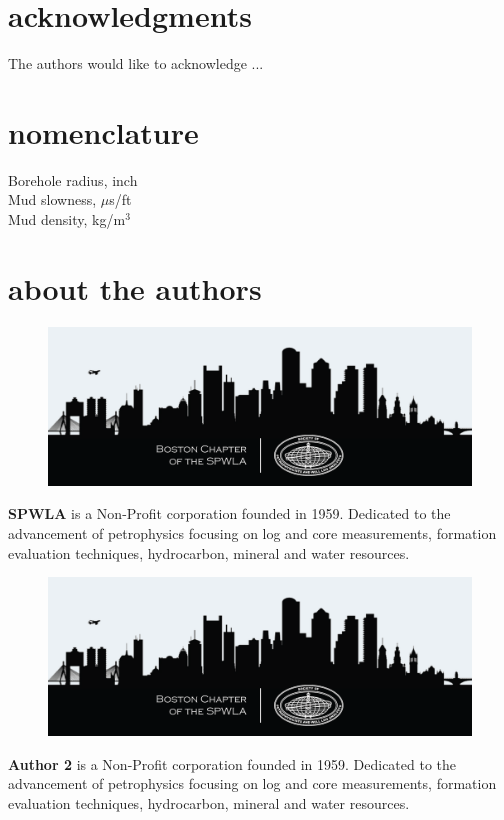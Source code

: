 \documentclass[10pt,twocolumn,twoside]{article}
\begin{document}
\section{acknowledgments}
The authors would like to acknowledge ...

\section{nomenclature}
  Borehole radius, inch\\
  Mud slowness, $\mu$s/ft\\
  Mud density, kg/m$^3$




\section{about the authors}
\setlength\intextsep{0pt}
\begin{figure}
	\includegraphics[width=1.0\linewidth]{boston_chapter_logo.png}
	\vspace{0.03in}
\end{figure}
\textbf{SPWLA} is a Non-Profit corporation founded in 1959. Dedicated to the advancement of petrophysics focusing on log and core measurements, formation evaluation techniques, hydrocarbon, mineral and water resources.

\begin{figure}
	\includegraphics[width=1.0\linewidth]{boston_chapter_logo.png}
	\vspace{0.03in}
\end{figure}
\textbf{Author 2} is a Non-Profit corporation founded in 1959. Dedicated to the advancement of petrophysics focusing on log and core measurements, formation evaluation techniques, hydrocarbon, mineral and water resources.
\end{document}

